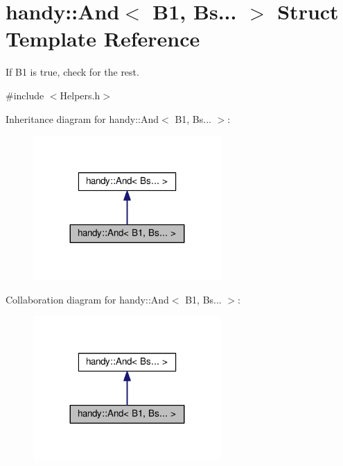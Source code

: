 \hypertarget{structhandy_1_1And_3_01B1_00_01Bs_8_8_8_01_4}{}\section{handy\+:\+:And$<$ B1, Bs... $>$ Struct Template Reference}
\label{structhandy_1_1And_3_01B1_00_01Bs_8_8_8_01_4}


If {\ttfamily B1} is true, check for the rest.  




{\ttfamily \#include $<$Helpers.\+h$>$}



Inheritance diagram for handy\+:\+:And$<$ B1, Bs... $>$\+:\nopagebreak
\begin{figure}[H]
\begin{center}
\leavevmode
\includegraphics[width=203pt]{structhandy_1_1And_3_01B1_00_01Bs_8_8_8_01_4__inherit__graph}
\end{center}
\end{figure}


Collaboration diagram for handy\+:\+:And$<$ B1, Bs... $>$\+:\nopagebreak
\begin{figure}[H]
\begin{center}
\leavevmode
\includegraphics[width=203pt]{structhandy_1_1And_3_01B1_00_01Bs_8_8_8_01_4__coll__graph}
\end{center}
\end{figure}


